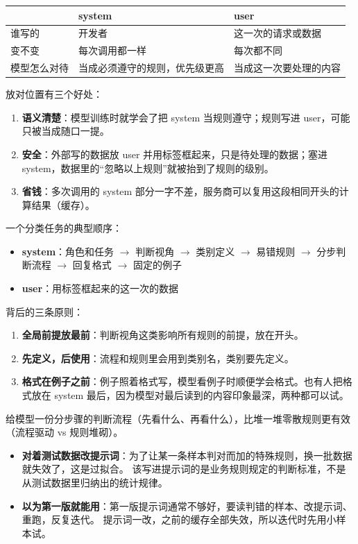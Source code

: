 \begin{center}
\begin{tabular}{p{3.2cm} p{5.6cm} p{5.6cm}}
  \toprule
   & system & user \\
  \midrule
  谁写的 & 开发者 & 这一次的请求或数据 \\
  变不变 & 每次调用都一样 & 每次都不同 \\
  模型怎么对待 & 当成必须遵守的规则，优先级更高 & 当成这一次要处理的内容 \\
  \bottomrule
\end{tabular}
\end{center}

放对位置有三个好处：
\begin{enumerate}
  \item \textbf{语义清楚}：模型训练时就学会了把 system 当规则遵守；规则写进 user，可能只被当成随口一提。
  \item \textbf{安全}：外部写的数据放 user 并用标签框起来，只是待处理的数据；塞进 system，数据里的“忽略以上规则”就被抬到了规则的级别。
  \item \textbf{省钱}：多次调用的 system 部分一字不差，服务商可以复用这段相同开头的计算结果（缓存）。
\end{enumerate}

一个分类任务的典型顺序：
\begin{itemize}
  \item \textbf{system}：角色和任务 $\to$ 判断视角 $\to$ 类别定义 $\to$ 易错规则 $\to$ 分步判断流程 $\to$ 回复格式 $\to$ 固定的例子
  \item \textbf{user}：用标签框起来的这一次的数据
\end{itemize}
背后的三条原则：
\begin{enumerate}
  \item \textbf{全局前提放最前}：判断视角这类影响所有规则的前提，放在开头。
  \item \textbf{先定义，后使用}：流程和规则里会用到类别名，类别要先定义。
  \item \textbf{格式在例子之前}：例子照着格式写，模型看例子时顺便学会格式。也有人把格式放在 system 最后，因为模型对最后读到的内容印象最深，两种都可以试。
\end{enumerate}
给模型一份分步骤的判断流程（先看什么、再看什么），比堆一堆零散规则更有效（流程驱动 vs 规则堆砌）。

\begin{itemize}
  \item \textbf{对着测试数据改提示词}：为了让某一条样本判对而加的特殊规则，换一批数据就失效了，这是过拟合。
        该写进提示词的是业务规则规定的判断标准，不是从测试数据里归纳出的统计规律。
  \item \textbf{以为第一版就能用}：第一版提示词通常不够好，要读判错的样本、改提示词、重跑，反复迭代。
        提示词一改，之前的缓存全部失效，所以迭代时先用小样本试。
\end{itemize}

